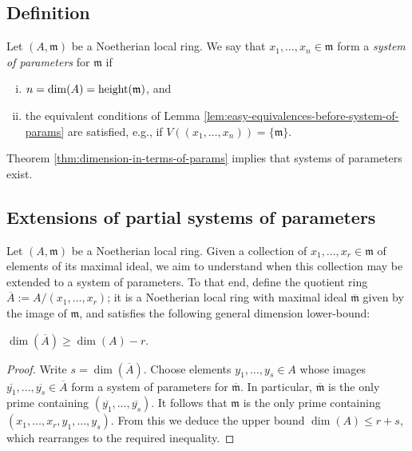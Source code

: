 \documentclass[10pt]{article}
\begin{document}
\subsection{Definition}
\label{sec:org9e31ea4}

\begin{definition}
  Let $(A,\mathfrak{m})$ be a Noetherian local ring.
  We say that $x_1,\dotsc,x_n \in \mathfrak{m}$
  form a \emph{system of parameters}
  for $\mathfrak{m}$
  if
  \begin{enumerate}[(i)]
  \item $n = \dim(A) = \operatorname{height}(\mathfrak{m})$,
    and
  \item   the equivalent conditions of
    Lemma
    \ref{lem:easy-equivalences-before-system-of-params}
    are
    satisfied,
    e.g., if $V((x_1,\dotsc,x_n)) = \{\mathfrak{m}\}$.
  \end{enumerate}
\end{definition}
Theorem \ref{thm:dimension-in-terms-of-params} implies
that systems of parameters exist.

\subsection{Extensions of partial systems of parameters}
\label{sec:orgdc48040}

Let \((A,\mathfrak{m})\) be a Noetherian local ring.
Given a collection of \(x_1,\dotsc,x_r \in \mathfrak{m}\) of elements of its maximal ideal,
we aim to understand when this collection may be extended
to a system of parameters.
To that end, define the quotient ring
\(\overline{A} := A / (x_1,\dotsc,x_r)\);
it is a Noetherian local ring with maximal ideal
\(\overline{\mathfrak{m}}\) given by the image of \(\mathfrak{m}\),
and satisfies the following general dimension lower-bound:
\begin{lemma}\label{lem:lower-bound-dimension-quotient-by-r-gens}
  $\dim(\overline{A}) \geq \dim(A) - r$.
\end{lemma}
\begin{proof}
  Write $s = \dim(\overline{A})$.
  Choose elements $y_1,\dotsc,y_s \in A$
  whose images $\overline{y_1},\dotsc,\overline{y_s} \in
  \overline{A}$
  form a system of parameters for $\overline{\mathfrak{m}}$.
  In particular,
  $\overline{\mathfrak{m}}$
  is the only prime containing
  $(\overline{y_1},\dotsc,\overline{y_s})$.
  It follows that
  $\mathfrak{m}$ is the only prime containing
  $(x_1,\dotsc,x_r,y_1,\dotsc,y_s)$.
  From this we deduce the upper bound $\dim(A) \leq r + s$,
  which rearranges to the required inequality.
\end{proof}
\end{document}
